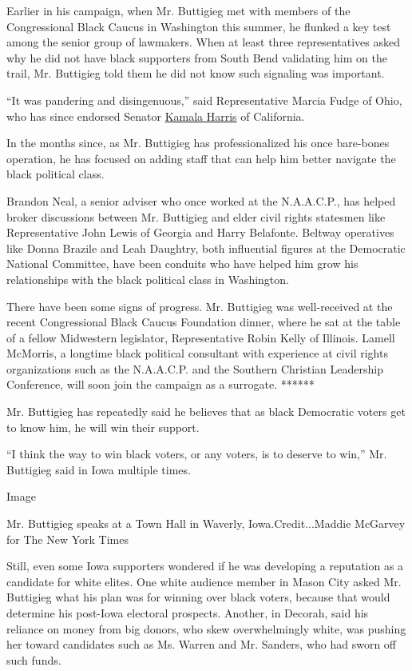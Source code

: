 Earlier in his campaign, when Mr. Buttigieg met with members of the
Congressional Black Caucus in Washington this summer, he flunked a key
test among the senior group of lawmakers. When at least three
representatives asked why he did not have black supporters from South
Bend validating him on the trail, Mr. Buttigieg told them he did not
know such signaling was important.

``It was pandering and disingenuous,'' said Representative Marcia Fudge
of Ohio, who has since endorsed Senator
\href{https://www.nytimes3xbfgragh.onion/interactive/2020/us/elections/kamala-harris.html}{Kamala
Harris} of California.

In the months since, as Mr. Buttigieg has professionalized his once
bare-bones operation, he has focused on adding staff that can help him
better navigate the black political class.

Brandon Neal, a senior adviser who once worked at the N.A.A.C.P., has
helped broker discussions between Mr. Buttigieg and elder civil rights
statesmen like Representative John Lewis of Georgia and Harry Belafonte.
Beltway operatives like Donna Brazile and Leah Daughtry, both
influential figures at the Democratic National Committee, have been
conduits who have helped him grow his relationships with the black
political class in Washington.

There have been some signs of progress. Mr. Buttigieg was well-received
at the recent Congressional Black Caucus Foundation dinner, where he sat
at the table of a fellow Midwestern legislator, Representative Robin
Kelly of Illinois. Lamell McMorris, a longtime black political
consultant with experience at civil rights organizations such as the
N.A.A.C.P. and the Southern Christian Leadership Conference, will soon
join the campaign as a surrogate. ******

Mr. Buttigieg has repeatedly said he believes that as black Democratic
voters get to know him, he will win their support.

``I think the way to win black voters, or any voters, is to deserve to
win,'' Mr. Buttigieg said in Iowa multiple times.

Image

Mr. Buttigieg speaks at a Town Hall in Waverly, Iowa.Credit...Maddie
McGarvey for The New York Times

Still, even some Iowa supporters wondered if he was developing a
reputation as a candidate for white elites. One white audience member in
Mason City asked Mr. Buttigieg what his plan was for winning over black
voters, because that would determine his post-Iowa electoral prospects.
Another, in Decorah, said his reliance on money from big donors, who
skew overwhelmingly white, was pushing her toward candidates such as Ms.
Warren and Mr. Sanders, who had sworn off such funds.

